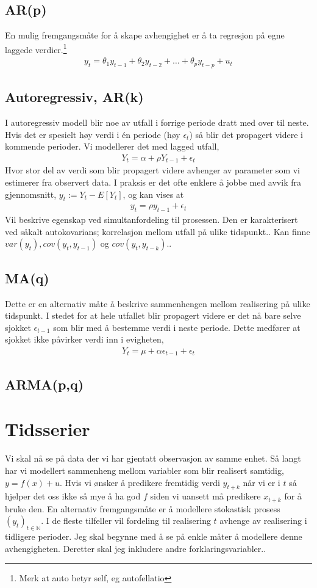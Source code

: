 \subsection{AR(p)}
En mulig fremgangsmåte for å skape avhengighet er å ta regresjon på egne laggede verdier.\footnote{Merk at auto betyr self, eg autofellatio}
\begin{align}
y_t = \theta_1 y_{t-1}+\theta_2 y_{t-2} + \dots + \theta_p y_{t-p}+u_t
\end{align}
\subsection{Autoregressiv, AR(k)}
I autoregressiv modell blir noe av utfall i forrige periode dratt med over til neste. Hvis det er spesielt høy verdi i én periode (høy $\epsilon_t$) så blir det propagert videre i kommende perioder. Vi modellerer det med lagged utfall,
\begin{align}
Y_t = \alpha + \rho Y_{t-1}+\epsilon_t
\end{align}
Hvor stor del av verdi som blir propagert videre avhenger av parameter som vi estimerer fra observert data. I praksis er det ofte enklere å jobbe med avvik fra gjennomsnitt, $y_t := Y_t-E[Y_t]$, og kan vises at
\begin{align}
y_t = \rho y_{t-1}+\epsilon_t
\end{align}
Vil beskrive egenskap ved simultanfordeling til prosessen. Den er karakterisert ved såkalt autokovarians; korrelasjon mellom utfall på ulike tidspunkt.. Kan finne $var(y_t), cov(y_t,y_{t-1})$ og $cov(y_t,y_{t-k})$..
\subsection{MA(q)}
Dette er en alternativ måte å beskrive sammenhengen mellom realisering på ulike tidspunkt. I stedet for at hele utfallet blir propagert videre er det nå bare selve sjokket $\epsilon_{t-1}$ som blir med å bestemme verdi i neste periode. Dette medfører at sjokket ikke påvirker verdi inn i evigheten,
\begin{align}
Y_t = \mu+\alpha \epsilon_{t-1}+\epsilon_t
\end{align}
\subsection{ARMA(p,q)}
\section{Tidsserier}
Vi skal nå se på data der vi har gjentatt observasjon av samme enhet. Så langt har vi modellert sammenheng mellom variabler som blir realisert samtidig, $y=f(x)+u$. Hvis vi ønsker å predikere fremtidig verdi $y_{t+k}$ når vi er i $t$ så hjelper det oss ikke så mye å ha god $f$ siden vi uansett må predikere $x_{t+k}$ for å bruke den. En alternativ fremgangsmåte er å modellere stokastisk prosess $(y_t)_{t \in \mathbb{N}}$. I de fleste tilfeller vil fordeling til realisering $t$ avhenge av realisering i tidligere perioder. Jeg skal begynne med å se på enkle måter å modellere denne avhengigheten. Deretter skal jeg inkludere andre forklaringsvariabler..
